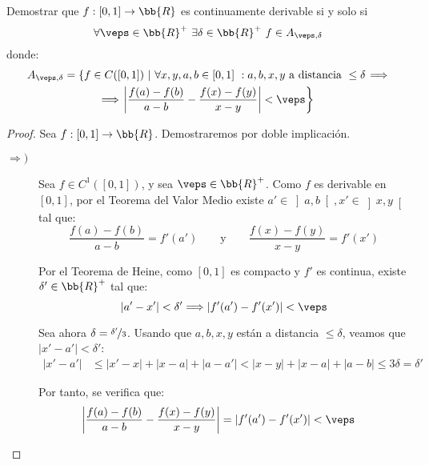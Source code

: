 \documentclass[12pt]{article}
\begin{document}
    \begin{ejercicio}
        Demostrar que $f:[0,1]\to \bb{R}$ es continuamente derivable si y solo si
        \begin{equation*}
            \forall\veps\in \bb{R}^+\ \exists\delta\in \bb{R}^+\ f\in A_{\veps,\delta}
        \end{equation*}
        donde:
        \begin{multline*}
            A_{\veps,\delta} = \left\{f\in C([0,1])\ \middle|\ \forall x,y,a,b\in [0,1]\ : a,b,x,y \text{ a distancia } \leq \delta\right. \Longrightarrow \\\Longrightarrow \left.\left|\frac{f(a)-f(b)}{a-b} - \frac{f(x)-f(y)}{x-y}\right| < \veps\right\}
        \end{multline*}
        \begin{proof}
            Sea $f:[0,1]\to \bb{R}$. Demostraremos por doble implicación.
            \begin{description}
                \item[$\Longrightarrow)$] Sea $f\in C^1([0,1])$, y sea $\veps\in \bb{R}^+$. Como $f$ es derivable en $[0,1]$, por el Teorema del Valor Medio existe $a'\in \left]a,b\right[, x'\in \left]x,y\right[$ tal que:
                \begin{equation*}
                    \frac{f(a)-f(b)}{a-b} = f'(a')\qquad \text{y}\qquad \frac{f(x)-f(y)}{x-y} = f'(x')
                \end{equation*}

                Por el Teorema de Heine, como $[0,1]$ es compacto y $f'$ es continua, existe $\delta'\in \bb{R}^+$ tal que:
                \begin{equation*}
                    |a'-x'| < \delta'
                    \Longrightarrow |f'(a') - f'(x')| < \veps
                \end{equation*}

                Sea ahora $\delta = \nicefrac{\delta'}{3}$. Usando que $a,b,x,y$ están a distancia $\leq \delta$, veamos que $|x'-a'| < \delta'$:
                \begin{align*}
                    |x'-a'| &\leq |x'-x| + |x-a| + |a-a'|< |x-y| + |x-a| + |a-b|\leq 3\delta = \delta'
                \end{align*}

                Por tanto, se verifica que:
                \begin{align*}
                    \left|\frac{f(a)-f(b)}{a-b} - \frac{f(x)-f(y)}{x-y}\right| &= |f'(a') - f'(x')| < \veps
                \end{align*}


\end{description}
\end{proof}
\end{ejercicio}
\end{document}
